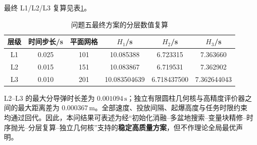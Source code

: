 最终 L1/L2/L3 复算见表\ref{tab:q5-conv}。
\begin{table}[tbp]
\centering
\caption{问题五最终方案的分层数值复算}
\label{tab:q5-conv}
\small
\begin{tabular}{cccccc}
\toprule
层级 & 时间步长/s & 平面网格 & $H_1$/s & $H_2$/s & $H_3$/s \\
\midrule
L1 & 0.025 & 101 & 10.085388 & 6.723315 & 7.363660 \\
L2 & 0.015 & 151 & 10.083867 & 6.719531 & 7.362902 \\
L3 & 0.010 & 201 & 10.083504639 & 6.718437500 & 7.362644043 \\
\bottomrule
\end{tabular}
\end{table}
L2--L3 的最大分导弹时长差为 $0.001094\,\mathrm s$；独立有限圆柱几何核与高精度评价器之间的最大距离差为 $0.000367\,\mathrm m$。全部速度、投放间隔、起爆高度与任务时限约束均通过回代。因此，本问结果可表述为经“初始化消融--多盆地搜索--变量块精修--时序抛光--分层复算--独立几何核”支持的\textbf{稳定高质量方案}，但不作理论全局最优声明。

\FloatBarrier
